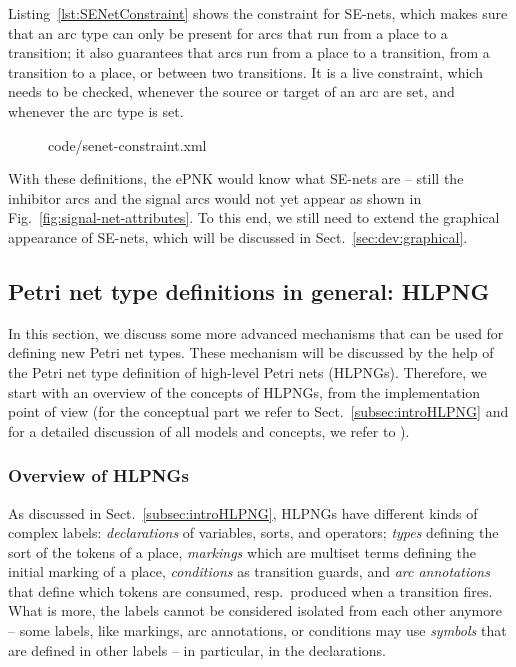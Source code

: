 Listing~\ref{lst:SENetConstraint} shows the constraint for SE-nets, which makes
sure that an arc type can only be present for arcs that run from a place to a
transition; it also guarantees that arcs run from a place to a transition, from
a transition to a place, or between two transitions. It is a live constraint,
which needs to be checked, whenever the source or target of an arc are set,
and whenever the arc type is set.
%
\begin{figure}[htbp!]
%
  {code/senet-constraint.xml}
\end{figure}

With these definitions, the ePNK would know what SE-nets are -- still the
inhibitor arcs and the signal arcs would not yet appear as shown in
Fig.~\ref{fig:signal-net-attributes}. To this end, we still need to
extend the graphical appearance of SE-nets, which will be discussed 
in Sect.~\ref{sec:dev:graphical}.%


\subsection{Petri net type definitions in general: HLPNG}
\label{subsec:complexPNTD}

In this section, we discuss some more advanced mechanisms that can be used for
defining new Petri net types. These mechanism will be discussed by the help
of the Petri net type definition of high-level Petri nets (HLPNGs). Therefore,
we start with an overview of the concepts of HLPNGs, from the implementation
point of view (for the conceptual part we refer to
Sect.~\ref{subsec:introHLPNG} and for a detailed discussion of all models and
concepts, we refer to \cite{HKea09}).

\subsubsection{Overview of HLPNGs}

As discussed in Sect.~\ref{subsec:introHLPNG}, HLPNGs have different kinds of
complex labels: \emph{declarations} of variables, sorts, and
operators; \emph{types} defining the sort of the tokens of a place,
\emph{markings} which are multiset terms defining the initial marking of a
place, \emph{conditions} as transition guards, and
\emph{arc annotations} that define which tokens are consumed, resp.\ produced
when a transition fires. What is more, the labels cannot be considered isolated from
each other anymore -- some labels, like markings, arc annotations, or
conditions may use \emph{symbols}%
that are defined in other labels -- in particular, in the declarations.

